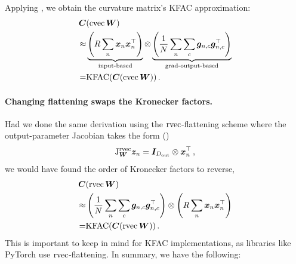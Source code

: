 Applying , we obtain the curvature matrix's KFAC approximation:
\begin{align*}
  {\bm{C}}&(\operatorname{cvec} {\bm{W}}) \\
  \approx&
           \underbrace{\left( R \sum_n {\bm{x}}_n {\bm{x}}_n^{\top} \right)}_{\text{input-based}}
           \otimes
           \underbrace{\left( \frac{1}{N} \sum_n \sum_c {\bm{g}}_{n,c} {\bm{g}}_{n,c}^{\top} \right)}_{\text{grad-output-based}}
  \\
  =& \mathrm{KFAC}({\bm{C}}(\operatorname{cvec} {\bm{W}}))\,.
\end{align*}

\paragraph{Changing flattening swaps the Kronecker factors.}
Had we done the same derivation using the $\operatorname{rvec}$-flattening scheme where the output-parameter Jacobian takes the form ()
$$ \mathrm{J}^{\operatorname{rvec}}_{{\bm{W}}}{\bm{z}}_n = {\bm{I}}_{D_{\text{out}}} \otimes {\bm{x}}_n^{\top}\,,$$
we would have found the order of Kronecker factors to reverse,
\begin{align*}
  {\bm{C}}&(\operatorname{rvec} {\bm{W}}) \\
  \approx&
           \left( \frac{1}{N} \sum_n \sum_c {\bm{g}}_{n,c} {\bm{g}}_{n,c}^{\top} \right)
           \otimes
           \left( R \sum_n {\bm{x}}_n {\bm{x}}_n^{\top} \right)
  \\
  =& \mathrm{KFAC}({\bm{C}}(\operatorname{rvec} {\bm{W}}))\,.
\end{align*}
This is important to keep in mind for KFAC implementations, as libraries like PyTorch use $\operatorname{rvec}$-flattening.
In summary, we have the following:

\switchcolumn[1]
\switchcolumn[0]

